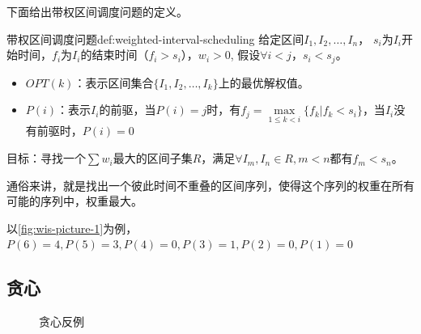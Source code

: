 下面给出带权区间调度问题的定义。

\begin{definition}{带权区间调度问题}{def:weighted-interval-scheduling}
	给定区间$I_1, I_2, \ldots, I_n$，
	$s_i$为$I_i$开始时间，$f_i$为$I_i$的结束时间（$f_i>s_i$），$w_i>0$, 假设$\forall i < j$，$ s_i<s_j$。
	\begin{itemize}
		\item $OPT(k)$：表示区间集合$\{ I_1, I_2, \ldots , I_k \}$上的最优解权值。
		\item $P(i)$：表示$I_i$的前驱，当$P(i)=j$时，有$f_j=\max\limits_{1 \leq k < i}\{f_k | f_k < s_i\}$，当$I_i$没有前驱时，$P(i)=0$
	\end{itemize}
	目标：寻找一个$\sum w_i$最大的区间子集$R$，满足$\forall I_m,I_n \in R, m < n \text{都有} f_m < s_n$。
\end{definition}

通俗来讲，就是找出一个彼此时间不重叠的区间序列，使得这个序列的权重在所有可能的序列中，权重最大。

\begin{remark}
	以\autoref{fig:wis-picture-1}为例，$P(6)=4, P(5)=3, P(4)=0, P(3)=1, P(2)=0, P(1)=0$
\end{remark}

\subsection{贪心}

\begin{figure}[hbt!]
	\centering
	\begin{subfigure}{.3\textwidth}
		\centering
		\caption{}\label{fig:wis-counterexample1}
	\end{subfigure}
	\begin{subfigure}{.3\textwidth}
		\centering
		\caption{}\label{fig:wis-counterexample2}
	\end{subfigure}
	\begin{subfigure}{.3\textwidth}
		\centering
		\caption{}\label{fig:wis-counterexample3}
	\end{subfigure}
	\caption{贪心反例}\label{fig:wis-counterexample}
\end{figure}

